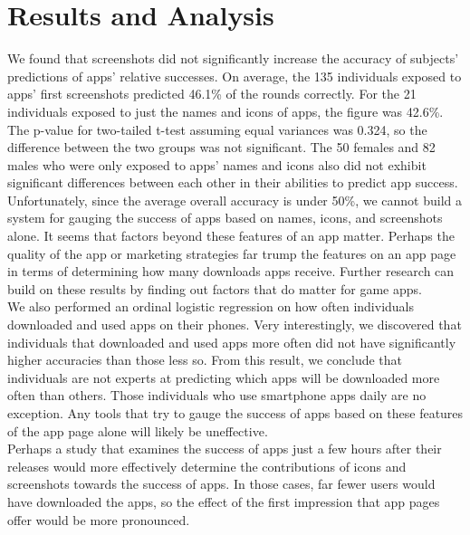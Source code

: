 \section{Results and Analysis}


We found that screenshots did not significantly increase the accuracy of subjects' predictions of apps' relative successes. On average, the 135 individuals exposed to apps' first screenshots predicted 46.1\% of the rounds correctly. For the 21 individuals exposed to just the names and icons of apps, the figure was 42.6\%. The p-value for two-tailed t-test assuming equal variances was 0.324, so the difference between the two groups was not significant. The 50 females and 82 males who were only exposed to apps' names and icons also did not exhibit significant differences between each other in their abilities to predict app success. \\

Unfortunately, since the average overall accuracy is under 50\%, we cannot build a system for gauging the success of apps based on names, icons, and screenshots alone. It seems that factors beyond these features of an app matter. Perhaps the quality of the app or marketing strategies far trump the features on an app page in terms of determining how many downloads apps receive. Further research can build on these results by finding out factors that do matter for game apps. \\

We also performed an ordinal logistic regression on how often individuals downloaded and used apps on their phones. Very interestingly, we discovered that individuals that downloaded and used apps more often did not have significantly higher accuracies than those less so. From this result, we conclude that individuals are not experts at predicting which apps will be downloaded more often than others. Those individuals who use smartphone apps daily are no exception. Any tools that try to gauge the success of apps based on these features of the app page alone will likely be uneffective. \\

Perhaps a study that examines the success of apps just a few hours after their releases would more effectively determine the contributions of icons and screenshots towards the success of apps. In those cases, far fewer users would have downloaded the apps, so the effect of the first impression that app pages offer would be more pronounced.
